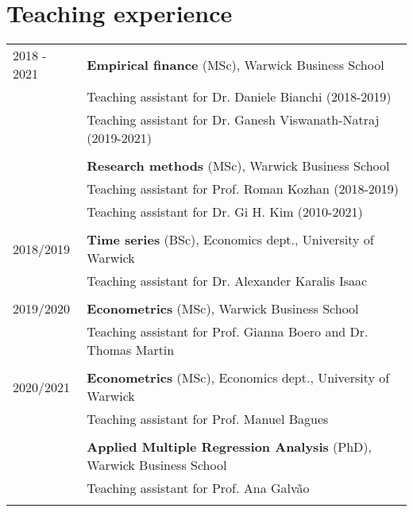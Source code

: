 \documentclass[a4paper,12pt]{article}
\begin{document}
\section{Teaching experience}
\begin{tabular}{ll}
2018 - 2021& \textbf{Empirical finance} (MSc), Warwick Business School \\
           & Teaching assistant for Dr. Daniele Bianchi (2018-2019)\\
           & Teaching assistant for Dr. Ganesh Viswanath-Natraj (2019-2021) \\
           & \\[.25em]
          & \textbf{Research methods} (MSc), Warwick Business School \\
          & Teaching assistant for Prof. Roman Kozhan (2018-2019)\\
          & Teaching assistant for Dr. Gi H. Kim (2010-2021)\\
          & \\[.25em]


2018/2019 & \textbf{Time series} (BSc), Economics dept., University of Warwick \\
          & \multicolumn{1}{l}{Teaching assistant for Dr. Alexander Karalis Isaac} \\
          & \\[.25em]
2019/2020 & \textbf{Econometrics} (MSc), Warwick Business School \\
          & \multicolumn{1}{l}{Teaching assistant for Prof. Gianna Boero and Dr. Thomas Martin }\\
          & \\[.25em]
2020/2021 & \textbf{Econometrics} (MSc), Economics dept.,  University of Warwick \\
          & \multicolumn{1}{l}{Teaching assistant for Prof. Manuel Bagues}\\
          & \\[.25em]
          & \textbf{Applied Multiple Regression Analysis} (PhD), Warwick Business School \\
          & \multicolumn{1}{l}{Teaching assistant for Prof. Ana Galv\~ao}\\
          & \\[.25em]
\end{tabular}
\end{document}
